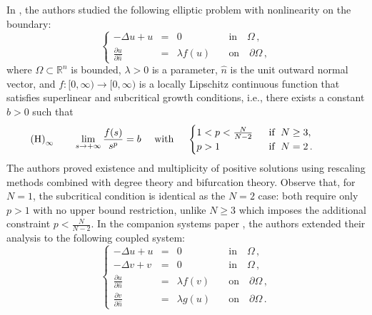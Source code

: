 \documentclass[12pt, reqno]{amsart}
\numberwithin{equation}{section}
\newcommand{\la}{\lambda}
\newcommand{\Om}{\Omega}
\newcommand{\p}{\partial}
\begin{document}
In \cite{BCDMP_2024}, the authors studied the following elliptic problem with nonlinearity on the boundary:
\begin{equation}
\label{pde_lambda}
\left\{
\begin{array}{rcll}
-\Delta u +u &=&  0 \quad &\mbox{in}\quad \Om\,,\\
\frac{\p u}{\p \widehat{n}} &=& \la f(u)\quad &\mbox{on}\quad \p \Om\,,
\end{array}
\right. 
\end{equation}
where $\Omega \subset \mathbb{R}^n$ is bounded, $\lambda>0$ is a parameter, $\widehat{n}$ is the unit outward normal vector, and $f:[0, \infty) \to [0, \infty)$ is a locally Lipschitz continuous function that satisfies superlinear and subcritical growth conditions, i.e., there exists a constant $b>0$ such that
%
\begin{equation*}
\hspace{-1cm} 
\mathrm{(H)}_\infty \qquad\lim\limits_{s \to +\infty}\frac{f(s)}{s^p}=b
\quad \mbox{ with }\quad \begin{cases}
1 < p < \frac{N}{N-2} \; &\mbox{ if }\;N\ge 3,\\ 
p>1\; &\mbox{ if }\;N=2   \,.
\end{cases}
\end{equation*}
The authors proved existence and multiplicity of positive solutions using rescaling methods combined with degree theory and bifurcation theory. Observe that, for $N = 1$, the subcritical condition is identical as the $N=2$ case: both require only $p > 1$ with no upper bound restriction, unlike $N \geq 3$ which imposes the additional constraint $p < \frac{N}{N-2}$.
In the companion systems paper \cite{BCDMP_Systems}, the authors extended their analysis to the following coupled system:
\begin{equation}
	\label{PDE_Sys}
	\left\{
	\begin{array}{rcll}
		-\Delta u +u&=&0   \quad & \mbox{in}\quad \Omega\,,\\
		-\Delta v +v &=&0  \quad &\mbox{in}\quad \Omega\,,\\
		\frac{\partial u}{\partial \widehat{n}} &=&  \lambda f(v)\quad &\mbox{on}\quad \partial \Omega\,,\\
		\frac{\partial v}{\partial \widehat{n}} &=&  \lambda g(u)\quad &\mbox{on}\quad \partial \Omega\,.
	\end{array}
	\right. 
\end{equation}
\end{document}
